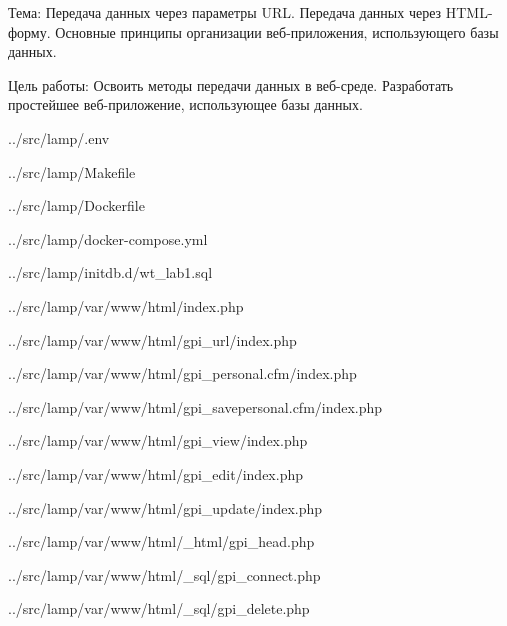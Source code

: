 Тема:
Передача данных через параметры URL.
Передача данных через HTML-форму.
Основные принципы организации веб-приложения, использующего базы данных.

Цель работы:
Освоить методы передачи данных в веб-среде.
Разработать простейшее веб-приложение, использующее базы данных.


{../src/lamp/.env}


{../src/lamp/Makefile}


{../src/lamp/Dockerfile}


{../src/lamp/docker-compose.yml}


{../src/lamp/initdb.d/wt_lab1.sql}


{../src/lamp/var/www/html/index.php}

\newpage


{../src/lamp/var/www/html/gpi_url/index.php}


{../src/lamp/var/www/html/gpi_personal.cfm/index.php}


{../src/lamp/var/www/html/gpi_savepersonal.cfm/index.php}


{../src/lamp/var/www/html/gpi_view/index.php}


{../src/lamp/var/www/html/gpi_edit/index.php}


{../src/lamp/var/www/html/gpi_update/index.php}


{../src/lamp/var/www/html/_html/gpi_head.php}


{../src/lamp/var/www/html/_sql/gpi_connect.php}


{../src/lamp/var/www/html/_sql/gpi_delete.php}
